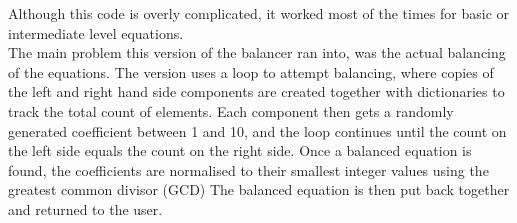 \documentclass[a4paper,12pt]{article}
\begin{document}
Although this code is overly complicated, it worked most of the times for basic or intermediate level equations.\\
The main problem this version of the balancer ran into, was the actual balancing of the equations. The version uses a loop to attempt balancing, where copies of the left and right hand side components are created together with dictionaries to track the total count of elements. Each component then gets a randomly generated coefficient between 1 and 10, and the loop continues until the count on the left side equals the count on the right side. Once a balanced equation is found, the coefficients are normalised to their smallest integer values using the greatest common divisor (GCD) The balanced equation is then put back together and returned to the user.\\
\end{document}
